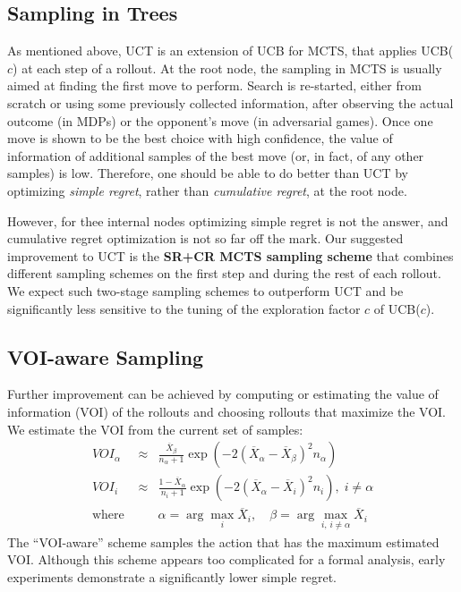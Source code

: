 \documentclass[letterpaper]{article}
\begin{document}
\subsection{Sampling in Trees}
\label{sec:sampling-in-trees}

As mentioned above, UCT \cite{Kocsis.uct} is an extension of UCB for
MCTS, that applies UCB($c$) at each step of a rollout.  At the root
node, the sampling in MCTS is usually aimed at finding the first move
to perform. Search is re-started, either from scratch or using some
previously collected information, after observing the actual outcome
(in MDPs) or the opponent's move (in adversarial games). Once one move
is shown to be the best choice with high confidence, the value of
information of additional samples of the best move (or, in fact, of
any other samples) is low. Therefore, one should be able to do better
than UCT by optimizing {\em simple regret}, rather than {\em
cumulative regret}, at the root node.

However, for thee internal nodes optimizing simple regret is not the
answer, and cumulative regret optimization is not so far off the
mark. Our suggested improvement to UCT is the \textbf{SR+CR MCTS
sampling scheme} that combines different sampling schemes on the first
step and during the rest of each rollout.  We expect such two-stage
sampling schemes to outperform UCT and be significantly less sensitive
to the tuning of the exploration factor $c$ of UCB($c$).


\subsection{VOI-aware Sampling}
\label{sec:voi-sampling}

Further improvement can be achieved by computing or estimating the
value of information (VOI) of the rollouts and choosing rollouts that
maximize the VOI. We estimate the VOI from
the current set of samples:
\begin{eqnarray}
VOI_\alpha&\approx&\frac {\overline X_\beta} {n_\alpha+1}
\exp\left(-2(\overline X_\alpha - \overline X_\beta)^2 n_\alpha\right)\\
VOI_i&\approx&\frac {1-\overline X_\alpha} {n_i+1}
\exp\left(-2(\overline X_\alpha - \overline X_i)^2 n_i\right),\; i\ne\alpha\nonumber\\
\mbox{where }&&\alpha=\arg\max_i \overline X_i,\quad
             \beta=\arg\max_{i,\,i\ne\alpha} \overline X_i\nonumber
\end{eqnarray}
The ``VOI-aware'' scheme samples the action that has the maximum
estimated VOI.  Although this scheme appears too complicated for
a formal analysis, early experiments demonstrate a significantly lower
simple regret.
\end{document}

